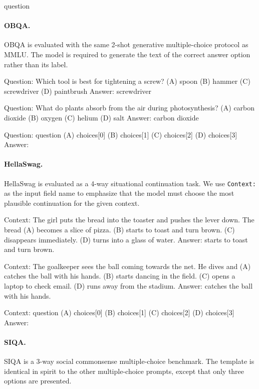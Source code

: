 \begin{promptbox}
{question}
\end{promptbox}

\paragraph{OBQA.}
OBQA is evaluated with the same 2-shot generative multiple-choice protocol as MMLU. The model is required to generate the text of the correct answer option rather than its label.

\begin{promptbox}
Question: Which tool is best for tightening a screw?
(A) spoon
(B) hammer
(C) screwdriver
(D) paintbrush
Answer: screwdriver

Question: What do plants absorb from the air during photosynthesis?
(A) carbon dioxide
(B) oxygen
(C) helium
(D) salt
Answer: carbon dioxide

Question: {question}
(A) {choices[0]}
(B) {choices[1]}
(C) {choices[2]}
(D) {choices[3]}
Answer:
\end{promptbox}

\paragraph{HellaSwag.}
HellaSwag is evaluated as a 4-way situational continuation task. We use \texttt{Context:} as the input field name to emphasize that the model must choose the most plausible continuation for the given context.

\begin{promptbox}
Context: The girl puts the bread into the toaster and pushes the lever down. The bread
(A) becomes a slice of pizza.
(B) starts to toast and turn brown.
(C) disappears immediately.
(D) turns into a glass of water.
Answer: starts to toast and turn brown.

Context: The goalkeeper sees the ball coming towards the net. He dives and
(A) catches the ball with his hands.
(B) starts dancing in the field.
(C) opens a laptop to check email.
(D) runs away from the stadium.
Answer: catches the ball with his hands.

Context: {question}
(A) {choices[0]}
(B) {choices[1]}
(C) {choices[2]}
(D) {choices[3]}
Answer:
\end{promptbox}

\paragraph{SIQA.}
SIQA is a 3-way social commonsense multiple-choice benchmark. The template is identical in spirit to the other multiple-choice prompts, except that only three options are presented.

